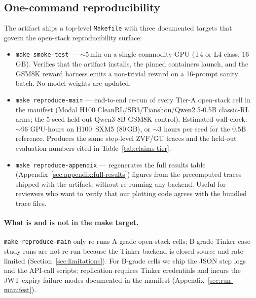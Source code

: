\subsection{One-command reproducibility}
\label{sec:repro-onecmd}

The artifact ships a top-level \texttt{Makefile} with three documented
targets that govern the open-stack reproducibility surface:

\begin{itemize}\setlength\itemsep{1pt}
  \item \texttt{make smoke-test} --- $\sim$5\,min on a single commodity
        GPU (T4 or L4 class, 16\,GB). Verifies that the artifact installs,
        the pinned containers launch, and the GSM8K reward harness emits a
        non-trivial reward on a 16-prompt sanity batch. No model weights are
        updated.
  \item \texttt{make reproduce-main} --- end-to-end re-run of every Tier-A
        open-stack cell in the manifest (Modal H100
        CleanRL/SB3/Tianshou/Qwen2.5-0.5B classic-RL arms; the 5-seed
        held-out Qwen3-8B GSM8K control). Estimated wall-clock:
        $\sim$96 GPU-hours on H100~SXM5 (80\,GB), or
        $\sim$3 hours per seed for the 0.5B reference. Produces the same
        step-level ZVF/GU traces and the held-out evaluation numbers cited
        in Table~\ref{tab:claims-tier}.
  \item \texttt{make reproduce-appendix} --- regenerates the full results
        table (Appendix~\ref{sec:appendix:full-results}) figures from the
        precomputed traces shipped with the artifact, without re-running
        any backend. Useful for reviewers who want to verify that our
        plotting code agrees with the bundled trace files.
\end{itemize}

\paragraph{What is and is not in the make target.}
\texttt{make reproduce-main} only re-runs A-grade open-stack cells; B-grade
Tinker case-study runs are not re-run because the Tinker backend is
closed-source and rate-limited (Section~\ref{sec:limitations}). For B-grade
cells we ship the JSON step logs and the API-call scripts; replication
requires Tinker credentials and incurs the JWT-expiry failure modes
documented in the manifest (Appendix~\ref{sec:run-manifest}).

